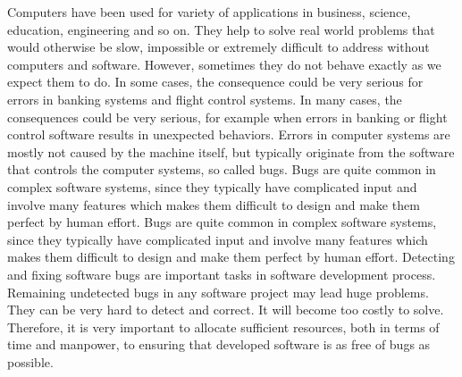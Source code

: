\label{chapter:verification}

Computers have been used for variety of applications in business, science, education, engineering and so on. They help to solve real world problems that would otherwise be slow, impossible or extremely difficult to address without computers and software. However, sometimes they do not behave exactly as we expect them to do. 
In some cases, the consequence could be very serious for errors in banking systems
and flight control systems.
{In many cases, the consequences could be very serious, for example when errors
in banking or flight control software results in unexpected behaviors.}
Errors in computer systems are mostly not caused by the machine itself, but typically originate from the software that controls the computer systems, so called bugs. 
%
Bugs are quite common  in complex software systems,
since they typically have complicated input and involve many features which makes them difficult to design and make them perfect by human effort.
{Bugs are quite common  in complex software systems,
since they typically have complicated input and involve many features which makes them difficult to design and make them perfect by human effort.}
%
Detecting and fixing software bugs are important tasks in software development process. Remaining undetected bugs in any software project may lead huge
problems. They can be very hard to detect and correct. It will
become too costly to solve. Therefore, it is very important to allocate sufficient
resources, both in terms of time and manpower, to ensuring that developed
software is as free of bugs as possible.

%
%
%

